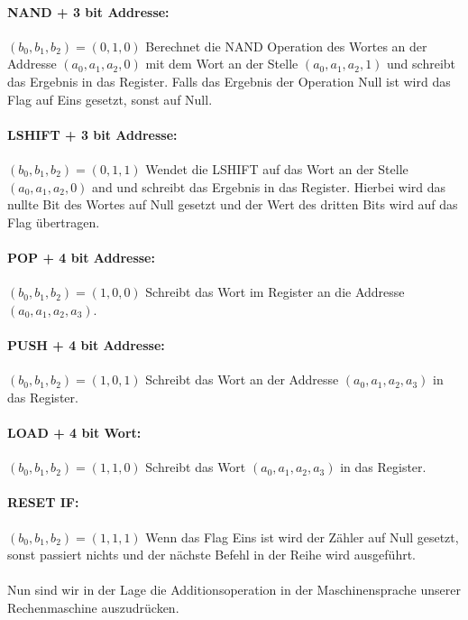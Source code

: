 \documentclass[11pt,a4paper,leqno]{report}
\numberwithin{equation}{chapter}
\begin{document}
\paragraph{NAND + 3 bit Addresse:} $(b_0, b_1, b_2) = (0, 1, 0)$ Berechnet die NAND Operation des Wortes an der Addresse $(a_0, a_1, a_2, 0)$ mit dem Wort an der Stelle $(a_0, a_1, a_2, 1)$ und schreibt das Ergebnis in das Register. Falls das Ergebnis der Operation Null ist wird das Flag auf Eins gesetzt, sonst auf Null.
\paragraph{LSHIFT + 3 bit Addresse:} $(b_0, b_1, b_2) = (0, 1, 1)$ Wendet die LSHIFT auf das Wort an der Stelle $(a_0, a_1, a_2, 0)$ and und schreibt das Ergebnis in das Register. Hierbei wird das nullte Bit des Wortes auf Null gesetzt und der Wert des dritten Bits wird auf das Flag \"ubertragen.
\paragraph{POP + 4 bit Addresse:} $(b_0, b_1, b_2) = (1, 0, 0)$ Schreibt das Wort im Register an die Addresse $(a_0, a_1, a_2, a_3)$.
\paragraph{PUSH + 4 bit Addresse:} $(b_0, b_1, b_2) = (1, 0, 1)$ Schreibt das Wort an der Addresse $(a_0, a_1, a_2, a_3)$ in das Register.
\paragraph{LOAD + 4 bit Wort:} $(b_0, b_1, b_2) = (1, 1, 0)$ Schreibt das Wort $(a_0, a_1, a_2, a_3)$ in das Register.
\paragraph{RESET IF:} $(b_0, b_1, b_2) = (1, 1, 1)$ Wenn das Flag Eins ist wird der Z\"ahler auf Null gesetzt, sonst passiert nichts und der n\"achste Befehl in der Reihe wird ausgef\"uhrt.
\\
\\
Nun sind wir in der Lage die Additionsoperation in der Maschinensprache unserer Rechenmaschine auszudr\"ucken.
\end{document}
